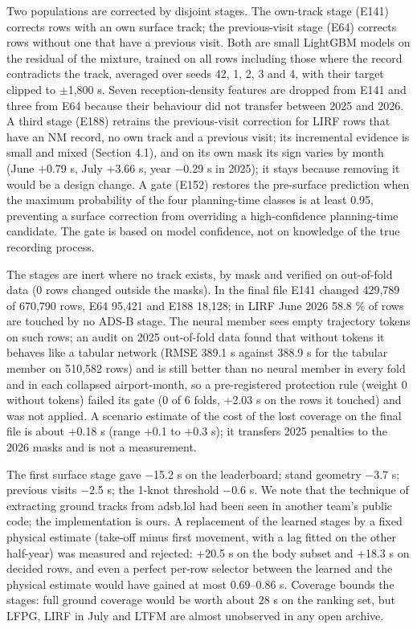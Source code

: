 \documentclass[11pt,a4paper]{article}
\begin{document}
Two populations are corrected by disjoint stages. The own-track stage (E141) corrects rows with an own surface track; the previous-visit stage (E64) corrects rows without one that have a previous visit. Both are small LightGBM models on the residual of the mixture, trained on all rows including those where the record contradicts the track, averaged over seeds 42, 1, 2, 3 and 4, with their target clipped to $\pm$1,800 s. Seven reception-density features are dropped from E141 and three from E64 because their behaviour did not transfer between 2025 and 2026. A third stage (E188) retrains the previous-visit correction for LIRF rows that have an NM record, no own track and a previous visit; its incremental evidence is small and mixed (Section 4.1), and on its own mask its sign varies by month (June +0.79 s, July +3.66 s, year $-$0.29 s in 2025); it stays because removing it would be a design change. A gate (E152) restores the pre-surface prediction when the maximum probability of the four planning-time classes is at least 0.95, preventing a surface correction from overriding a high-confidence planning-time candidate. The gate is based on model confidence, not on knowledge of the true recording process.

The stages are inert where no track exists, by mask and verified on out-of-fold data (0 rows changed outside the masks). In the final file E141 changed 429,789 of 670,790 rows, E64 95,421 and E188 18,128; in LIRF June 2026 58.8 \% of rows are touched by no ADS-B stage. The neural member sees empty trajectory tokens on such rows; an audit on 2025 out-of-fold data found that without tokens it behaves like a tabular network (RMSE 389.1 s against 388.9 s for the tabular member on 510,582 rows) and is still better than no neural member in every fold and in each collapsed airport-month, so a pre-registered protection rule (weight 0 without tokens) failed its gate (0 of 6 folds, +2.03 s on the rows it touched) and was not applied. A scenario estimate of the cost of the lost coverage on the final file is about +0.18 s (range +0.1 to +0.3 s); it transfers 2025 penalties to the 2026 masks and is not a measurement.

The first surface stage gave $-$15.2 s on the leaderboard; stand geometry $-$3.7 s; previous visits $-$2.5 s; the 1-knot threshold $-$0.6 s. We note that the technique of extracting ground tracks from adsb.lol had been seen in another team's public code; the implementation is ours. A replacement of the learned stages by a fixed physical estimate (take-off minus first movement, with a lag fitted on the other half-year) was measured and rejected: +20.5 s on the body subset and +18.3 s on decided rows, and even a perfect per-row selector between the learned and the physical estimate would have gained at most 0.69--0.86 s. Coverage bounds the stages: full ground coverage would be worth about 28 s on the ranking set, but LFPG, LIRF in July and LTFM are almost unobserved in any open archive.
\end{document}
